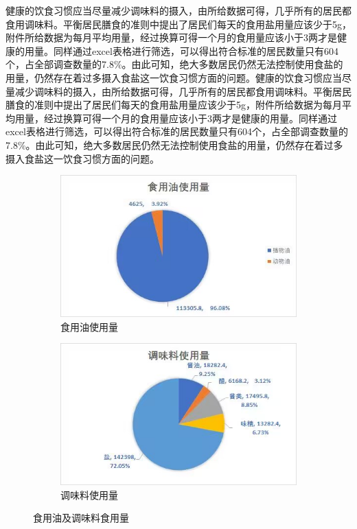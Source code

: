 \documentclass{cumcmthesis}
\begin{document}
 健康的饮食习惯应当尽量减少调味料的摄入，由所给数据可得，几乎所有的居民都食用调味料。平衡居民膳食的准则中提出了居民们每天的食用盐用量应该少于5g，附件所给数据为每月平均用量，经过换算可得一个月的食用量应该小于3两才是健康的用量。同样通过excel表格进行筛选，可以得出符合标准的居民数量只有604个，占全部调查数量的7.8\%。由此可知，绝大多数居民仍然无法控制使用食盐的用量，仍然存在着过多摄入食盐这一饮食习惯方面的问题。健康的饮食习惯应当尽量减少调味料的摄入，由所给数据可得，几乎所有的居民都食用调味料。平衡居民膳食的准则中提出了居民们每天的食用盐用量应该少于5g，附件所给数据为每月平均用量，经过换算可得一个月的食用量应该小于3两才是健康的用量。同样通过excel表格进行筛选，可以得出符合标准的居民数量只有604个，占全部调查数量的7.8\%。由此可知，绝大多数居民仍然无法控制使用食盐的用量，仍然存在着过多摄入食盐这一饮食习惯方面的问题。
\begin{figure}[H]
  \centering

  \begin{subfigure}[b]{0.45\textwidth}
    \includegraphics[width=\textwidth]{figures/QQ图片20230813183040.jpg}
    \caption{食用油使用量}
    \label{t11}
  \end{subfigure}
  \hfill
  \begin{subfigure}[b]{0.45\textwidth}
    \includegraphics[width=\textwidth]{figures/QQ图片20230813170545.jpg}
    \caption{调味料使用量}
    \label{t12}
  \end{subfigure}
  \caption{食用油及调味料食用量}
\end{figure}
\end{document}
